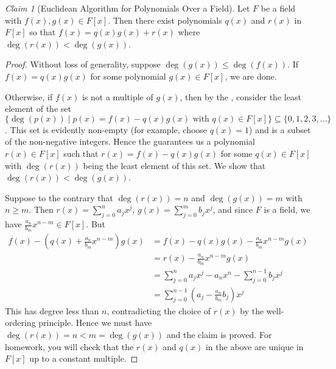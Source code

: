 \documentclass[12pt,letterpaper,DIV=11,final]{scrartcl}
\theoremstyle{plain}
\theoremstyle{definition}
\theoremstyle{remark}
\newtheorem{claim}{Claim}
\begin{document}
\begin{claim}[Euclidean Algorithm for Polynomials Over a Field]
  Let $F$ be a field with $f(x), g(x) \in F[x]$.
  Then there exist polynomials $q(x)$ and $r(x)$ in $F[x]$ so that $f(x) = q(x) g(x) + r(x)$ where $\deg(r(x)) < \deg(g(x))$.

  \begin{proof}
    Without loss of generality, suppose $\deg(g(x)) \leq \deg(f(x))$.
    If $f(x) = q(x) g(x)$ for some polynomial $g(x) \in F[x]$, we are done.

    Otherwise, if $f(x)$ is not a multiple of $g(x)$, then by the , consider the least element of the set
    \begin{displaymath}
      \{ \deg(p(x)) \mid p(x) = f(x) - q(x) g(x) \text{ with } q(x) \in F[x] \} \subseteq \{ 0, 1, 2, 3, \dots \}
    \end{displaymath} .
    This set is evidently non-empty (for example, choose $q(x) = 1$) and is a subset of the non-negative integers.
    Hence the  guarantees us a polynomial $r(x) \in F[x]$ such that $r(x) = f(x) - q(x) g(x)$ for some $q(x) \in F[x]$ with $\deg(r(x))$ being the least element of this set.
    We show that $\deg(r(x)) < \deg(g(x))$.

    Suppose to the contrary that $\deg(r(x)) = n$ and $\deg(g(x)) = m$ with $n \geq m$.
    Then $r(x) = \sum_{j = 0}^n a_j x^j$, $g(x) = \sum_{j = 0}^m b_j x^j$, and since $F$ is a field, we have $\frac{a_n}{b_m} x^{n - m} \in F[x]$.
    But
    \begin{align*}
      f(x) - \left( q(x) + \frac{a_n}{b_m} x^{n - m} \right) g(x) &= f(x) - q(x) g(x) - \frac{a_n}{b_m} x^{n - m} g(x) \\
                                                                  &= r(x) - \frac{a_n}{b_m} x^{n - m} g(x) \\
                                                                  &= \sum_{j = 0}^n a_j x^j - a_n x^n - \sum_{j = 0}^{n - 1} b_j x^j \\
                                                                  &= \sum_{j = 0}^{n - 1} \left( a_j - \frac{a_n}{b_m} b_j \right) x^j
    \end{align*}
    This has degree less than $n$, contradicting the choice of $r(x)$ by the well-ordering principle.
    Hence we must have $\deg(r(x)) = n < m = \deg(g(x))$ and the claim is proved.
    For homework, you will check that the $r(x)$ and $q(x)$ in the above are unique in $F[x]$ up to a constant multiple.
  \end{proof}
\end{claim}
\end{document}
